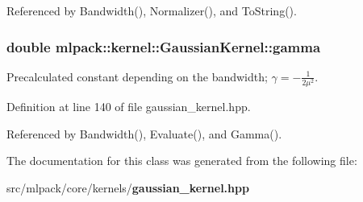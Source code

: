 Referenced by Bandwidth(), Normalizer(), and To\-String().

\subsubsection[{gamma}]{\setlength{\rightskip}{0pt plus 5cm}double mlpack\-::kernel\-::\-Gaussian\-Kernel\-::gamma\hspace{0.3cm}{\ttfamily [private]}}\label{classmlpack_1_1kernel_1_1GaussianKernel_a7f019a726e3dca20edb7721ad994fe6a}


Precalculated constant depending on the bandwidth; $ \gamma = -\frac{1}{2 \mu^2} $. 



Definition at line 140 of file gaussian\-\_\-kernel.\-hpp.



Referenced by Bandwidth(), Evaluate(), and Gamma().



The documentation for this class was generated from the following file\-:\begin{DoxyCompactItemize}
\item 
src/mlpack/core/kernels/{\bf gaussian\-\_\-kernel.\-hpp}\end{DoxyCompactItemize}
